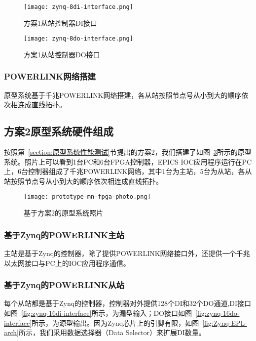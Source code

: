 \begin{figure}[!htb]
  \centering
  \texttt{[image: zynq-8di-interface.png]}
  \caption{方案1从站控制器DI接口}
  \label{fig:zynq-8di-interface}
\end{figure}

\begin{figure}[!htb]
  \centering
  \texttt{[image: zynq-8do-interface.png]}
  \caption{方案1从站控制器DO接口}
  \label{fig:zynq-8do-interface}
\end{figure}

\subsubsection{POWERLINK网络搭建}

原型系统基于千兆POWERLINK网络搭建，各从站按照节点号从小到大的顺序依次相连成直线拓扑。

\subsection{方案2原型系统硬件组成} 

按照第~\ref{section:原型系统性能测试}节提出的方案2，我们搭建了如图~\ref{fig:prototype-mn-fpga-photo}所示的原型系统。照片上可以看到1台PC和6台FPGA控制器，EPICS IOC应用程序运行在PC上，6台控制器组成了千兆POWERLINK网络，其中1台为主站，5台为从站，各从站按照节点号从小到大的顺序依次相连成直线拓扑。

\begin{figure}[!htb]
  \centering
  \texttt{[image: prototype-mn-fpga-photo.png]}
  \caption{基于方案2的原型系统照片}
  \label{fig:prototype-mn-fpga-photo}
\end{figure}

\subsubsection{基于Zynq的POWERLINK主站}

主站是基于Zynq的控制器，除了提供POWERLINK网络接口外，还提供一个千兆以太网接口与PC上的IOC应用程序通信。

\subsubsection{基于Zynq的POWERLINK从站}

每个从站都是基于Zynq的控制器，控制器对外提供128个DI和32个DO通道,DI接口如图~\ref{fig:zynq-16di-interface}所示，为漏型输入；DO接口如图~\ref{fig:zynq-16do-interface}所示，为源型输出。因为Zynq芯片上的引脚有限，如图~\ref{fig:Zynq-EPL-arch}所示，我们采用数据选择器（Data Selector）来扩展DI数量。

